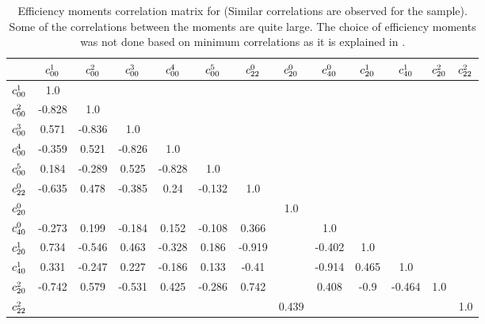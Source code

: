 \begin{sidewaystable}[p!]
\centering
\footnotesize
\begin{tabular}{c c c c c c c c c c c c c}
\hline
& $c^{1}_{00}$ & $c^{2}_{00}$ & $c^{3}_{00}$ & $c^{4}_{00}$ & $c^{5}_{00}$ &
  $c^{0}_{22}$ & $c^{0}_{20}$ & $c^{0}_{40}$ & $c^{1}_{20}$ & $c^{1}_{40}$ &
  $c^{2}_{20}$ & $c^{2}_{22}$  \\
\hline
$c^{1}_{00}$  &     1.0 &  &  &  &  &  &  &  &  &  &  &\\
$c^{2}_{00}$  &  -0.828 &     1.0 &  &  &  &  &  &  &  &  & & \\
$c^{3}_{00}$  &   0.571&  -0.836&     1.0 &  &  &  &  &  &  &  & & \\
$c^{4}_{00}$  &  -0.359&   0.521&  -0.826&     1.0 &  &  &  &  &  &  & &  \\
$c^{5}_{00}$  &   0.184&  -0.289&   0.525&  -0.828&     1.0 &  &  &  &  &  & &  \\
$c^{0}_{22}$  &  -0.635&   0.478&  -0.385&    0.24&  -0.132&     1.0 &  &  &  &  &  & \\
$c^{0}_{20}$  &        &        &        &        &        &        &     1.0 &  &  &  &  & \\
$c^{0}_{40}$  &  -0.273&   0.199&  -0.184&   0.152&  -0.108&   0.366&        &     1.0 &  &  &  & \\
$c^{1}_{20}$  &   0.734&  -0.546&   0.463&  -0.328&   0.186&  -0.919&        &  -0.402&     1.0 &  &   &\\
$c^{1}_{40}$  &   0.331&  -0.247&   0.227&  -0.186&   0.133&   -0.41&        &  -0.914&   0.465&     1.0 &  & \\
$c^{2}_{20}$  &  -0.742&   0.579&  -0.531&   0.425&  -0.286&   0.742&        &   0.408&    -0.9&  -0.464&     1.0 & \\
$c^{2}_{22}$  &        &        &        &        &        &        &   0.439&        &        &        &        &     1.0\\
\hline
\end{tabular}
\caption{Efficiency moments correlation matrix for \BsJpsiKst (Similar correlations are observed for the \BsbarJpsiKst sample).
         Some of the correlations between the moments are quite large. The choice of efficiency moments was not done based on
          minimum correlations as it is explained in . }
\label{eff_moms_corr}
\end{sidewaystable}


